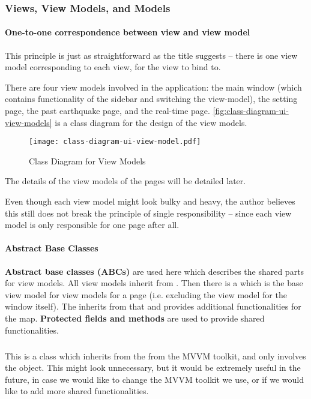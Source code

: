\subsubsection{Views, View Models, and Models}

\paragraph{One-to-one correspondence between view and view model}

This principle is just as straightforward as the title suggests -- there is one view model corresponding to each view, for the view to bind to.

There are four view models involved in the application: the main window (which contains functionality of the sidebar and switching the view-model), the setting page, the past earthquake page, and the real-time page. \autoref{fig:class-diagram-ui-view-models} is a class diagram for the design of the view models.

\begin{figure}
    \centering
    \texttt{[image: class-diagram-ui-view-model.pdf]}
    \caption{Class Diagram for View Models}
    \label{fig:class-diagram-ui-view-models}
\end{figure}

The details of the view models of the pages will be detailed later.

Even though each view model might look bulky and heavy, the author believes this still does not break the principle of single responsibility -- since each view model is only responsible for one page after all.

\paragraph{Abstract Base Classes}

\textbf{Abstract base classes (ABCs)} are used here which describes the shared parts for view models. All view models inherit from . Then there is a  which is the base view model for view models for a page (i.e. excluding the view model for the window itself). The  inherits from that and provides additional functionalities for the map. \textbf{Protected fields and methods} are used to provide shared functionalities.

\subparagraph{}

This is a class which inherits from the  from the MVVM toolkit, and only involves the  object. This might look unnecessary, but it would be extremely useful in the future, in case we would like to change the MVVM toolkit we use, or if we would like to add more shared functionalities.


